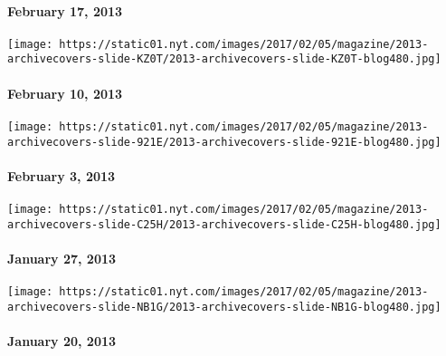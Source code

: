 \hypertarget{february-17-2013}{%
\paragraph{February 17, 2013}\label{february-17-2013}}

\href{http://www.nytimes.com/indexes/2013/02/10/magazine/index.html}{}

\texttt{[image: https://static01.nyt.com/images/2017/02/05/magazine/2013-archivecovers-slide-KZ0T/2013-archivecovers-slide-KZ0T-blog480.jpg]}

\hypertarget{february-10-2013}{%
\paragraph{February 10, 2013}\label{february-10-2013}}

\href{http://www.nytimes.com/indexes/2013/02/03/magazine/index.html}{}

\texttt{[image: https://static01.nyt.com/images/2017/02/05/magazine/2013-archivecovers-slide-921E/2013-archivecovers-slide-921E-blog480.jpg]}

\hypertarget{february-3-2013}{%
\paragraph{February 3, 2013}\label{february-3-2013}}

\href{http://www.nytimes.com/indexes/2013/01/27/magazine/index.html}{}

\texttt{[image: https://static01.nyt.com/images/2017/02/05/magazine/2013-archivecovers-slide-C25H/2013-archivecovers-slide-C25H-blog480.jpg]}

\hypertarget{january-27-2013}{%
\paragraph{January 27, 2013}\label{january-27-2013}}

\href{http://www.nytimes.com/indexes/2013/01/20/magazine/index.html}{}

\texttt{[image: https://static01.nyt.com/images/2017/02/05/magazine/2013-archivecovers-slide-NB1G/2013-archivecovers-slide-NB1G-blog480.jpg]}

\hypertarget{january-20-2013}{%
\paragraph{January 20, 2013}\label{january-20-2013}}

